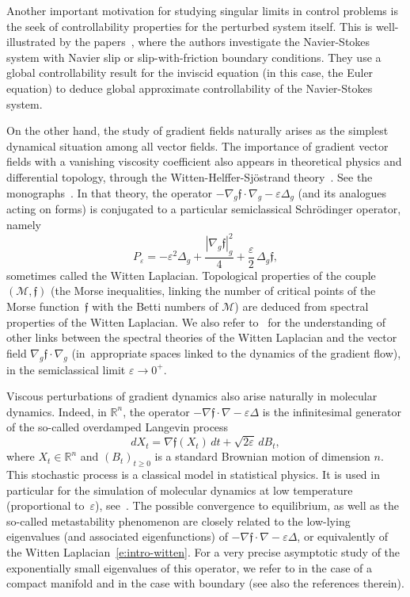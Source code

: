 \documentclass[JEP,XML,SOM,Unicode]{cedram}
\theoremstyle{definition}
\newcommand{\M}{\ensuremath{\mathcal M}}
\newcommand{\mb}[1]{\ensuremath{\mathbb{#1}}}
\newcommand{\R}{{\mb{R}}}
\newcommand{\f}{\ensuremath{\mathfrak{f}}}
\let\eps\varepsilon
\begin{document}
Another important motivation for studying singular limits in control problems is the seek of controllability properties for the perturbed system itself. This is well-illustrated by the papers~\cite{Cor:96,CF:96,ChaNavier:09,CMS:19}, where the authors investigate the Navier-Stokes system with Navier slip or slip-with-friction boundary conditions. They use a global controllability result for the inviscid equation (in this case, the Euler equation) to deduce global approximate controllability of the Navier-Stokes system.

On the other hand, the study of gradient fields naturally arises as the simplest dynamical situation among all vector fields.
The importance of gradient vector fields with a vanishing viscosity coefficient also appears in theoretical physics and differential topology, through the Witten-Helffer-Sjöstrand theory~\cite{Witten:82,HS:85}. See \eg the monographs~\cite{Helffer:booksemiclassic,CFKS}.
In that theory, the operator $- \nabla_g \f \cdot \nabla_g - \eps \Delta_g$ (and its analogues acting on forms) is conjugated to a particular semiclassical Schrödinger operator, namely
\begin{equation}
\label{e:intro-witten}
P_\eps = -\eps^2 \Delta_g + \frac{|\nabla_g \f|_g^2}{4} + \frac{\eps}{2}\, \Delta_g \f,
\end{equation}
sometimes called the Witten Laplacian.
Topological properties of the couple $(\M,\f)$ (\eg the Morse inequalities, linking the number of critical points of the Morse function~$\f$ with the Betti numbers of $\M$) are deduced from spectral properties of the Witten Laplacian.
We also refer to~\cite{DR:20} for the understanding of other links between the spectral theories of the Witten Laplacian and the vector field $\nabla_g \f \cdot \nabla_g$ (in~appropriate spaces linked to the dynamics of the gradient flow), in the semiclassical limit $\eps\to 0^+$.

Viscous perturbations of gradient dynamics also arise naturally in molecular dynamics.
Indeed, in $\R^n$, the operator $- \nabla \f \cdot \nabla - \eps \Delta$ is the infinitesimal generator of the so-called overdamped Langevin process
\[
dX_t = \nabla \f(X_t)\, dt + \sqrt{2\eps}\, dB_t,
\]
where $X_t\in \R^n$ and $(B_t)_{t\geq0}$ is a standard Brownian motion of dimension $n$. This stochastic process is a classical model in statistical physics. It is used in particular for the simulation of molecular dynamics at low temperature (proportional to~$\eps$), see~\cite{Chan:43,SM:79}. The possible convergence to equilibrium, as well as the so-called metastability phenomenon are closely related to the low-lying eigenvalues (and associated eigenfunctions) of $- \nabla \f \cdot \nabla - \eps \Delta$, or equivalently of the Witten Laplacian~\eqref{e:intro-witten}.
For a very precise asymptotic study of the exponentially small eigenvalues of this operator, we refer \eg to \cite{HKN:04,Michel:19} in the case of a compact manifold and \cite{HN:06,LePeutrec:10,DLLN:19} in the case with boundary (see also the references therein).
\end{document}
